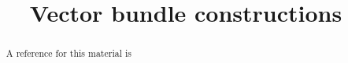 \documentclass{ximera}
\title{Vector bundle constructions}
\begin{document}
    \begin{abstract} A reference for this material is   \end{abstract}
    \maketitle
\end{document}
